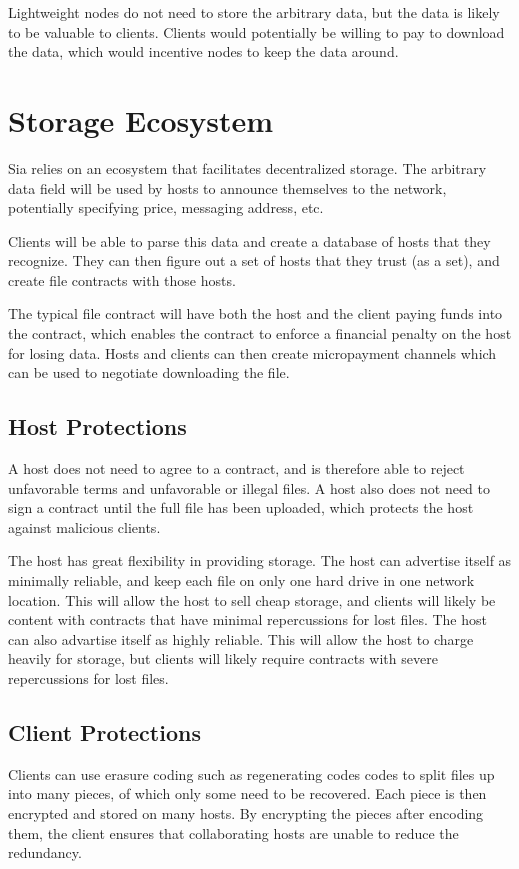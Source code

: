 \documentclass[twocolumn]{article}
\begin{document}
Lightweight nodes do not need to store the arbitrary data, but the data is likely to be valuable to clients.
Clients would potentially be willing to pay to download the data, which would incentive nodes to keep the data around.

\section{Storage Ecosystem}
Sia relies on an ecosystem that facilitates decentralized storage.
The arbitrary data field will be used by hosts to announce themselves to the network, potentially specifying price, messaging address, etc.

Clients will be able to parse this data and create a database of hosts that they recognize.
They can then figure out a set of hosts that they trust (as a set), and create file contracts with those hosts.

The typical file contract will have both the host and the client paying funds into the contract, which enables the contract to enforce a financial penalty on the host for losing data.
Hosts and clients can then create micropayment channels \cite{mpc} which can be used to negotiate downloading the file.

\subsection{Host Protections}
A host does not need to agree to a contract, and is therefore able to reject unfavorable terms and unfavorable or illegal files.
A host also does not need to sign a contract until the full file has been uploaded, which protects the host against malicious clients.

The host has great flexibility in providing storage.
The host can advertise itself as minimally reliable, and keep each file on only one hard drive in one network location.
This will allow the host to sell cheap storage, and clients will likely be content with contracts that have minimal repercussions for lost files.
The host can also advartise itself as highly reliable.
This will allow the host to charge heavily for storage, but clients will likely require contracts with severe repercussions for lost files.

\subsection{Client Protections}
Clients can use erasure coding such as regenerating codes \cite{reg} codes to split files up into many pieces, of which only some need to be recovered.
Each piece is then encrypted and stored on many hosts.
By encrypting the pieces after encoding them, the client ensures that collaborating hosts are unable to reduce the redundancy.
\end{document}
